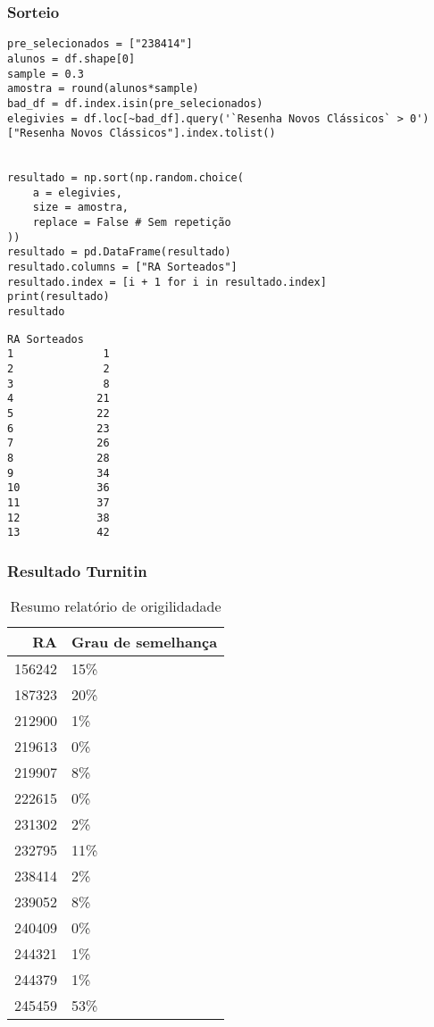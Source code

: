 \documentclass[11pt]{article}
\begin{document}
\subsubsection{Sorteio}
\label{sec:org48c23d9}

\begin{verbatim}
pre_selecionados = ["238414"]
alunos = df.shape[0]
sample = 0.3
amostra = round(alunos*sample)
bad_df = df.index.isin(pre_selecionados)
elegivies = df.loc[~bad_df].query('`Resenha Novos Clássicos` > 0')["Resenha Novos Clássicos"].index.tolist()


resultado = np.sort(np.random.choice(
    a = elegivies,
    size = amostra,
    replace = False # Sem repetição
))
resultado = pd.DataFrame(resultado)
resultado.columns = ["RA Sorteados"]
resultado.index = [i + 1 for i in resultado.index]
print(resultado)
resultado
\end{verbatim}

\begin{verbatim}
RA Sorteados
1              1
2              2
3              8
4             21
5             22
6             23
7             26
8             28
9             34
10            36
11            37
12            38
13            42
\end{verbatim}

\subsubsection{Resultado Turnitin}
\label{sec:org2cbe7f5}

\begin{table}[htbp]
\caption{\label{TurnitinNvC}Resumo relatório de origilidadade}
\centering
\begin{tabular}{rl}
\hline
RA & Grau de semelhança\\
\hline
156242 & 15\%\\
187323 & 20\%\\
212900 & 1\%\\
219613 & 0\%\\
219907 & 8\%\\
222615 & 0\%\\
231302 & 2\%\\
232795 & 11\%\\
238414 & 2\%\\
239052 & 8\%\\
240409 & 0\%\\
244321 & 1\%\\
244379 & 1\%\\
245459 & 53\%\\
\hline
\end{tabular}
\end{table}
\end{document}
